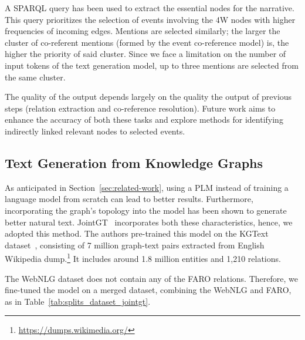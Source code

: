 \documentclass[
hf, %
]{ceurart}
\begin{document}

A SPARQL query has been used to extract the essential nodes for the narrative. This query prioritizes the selection of events involving the 4W nodes with higher frequencies of incoming edges. Mentions are selected similarly; the larger the cluster of co-referent mentions (formed by the event co-reference model) is, the higher the priority of said cluster. Since we face a limitation on the number of input tokens of the text generation model, up to three mentions are selected from the same cluster.

The quality of the output depends largely on the quality the output of previous steps (relation extraction and co-reference resolution). Future work aims to enhance the accuracy of both these tasks and explore methods for identifying indirectly linked relevant nodes to selected events.


\subsection{Text Generation from Knowledge Graphs}
As anticipated in Section~\ref{sec:related-work}, using a PLM instead of training a language model from scratch can lead to better results. Furthermore, incorporating the graph's topology into the model has been shown to generate better natural text. JointGT~\cite{JointGT} incorporates both these characteristics, hence, we adopted this method. The authors pre-trained this model on the KGText dataset~\cite{KGtext}, consisting of 7 million graph-text pairs extracted from English Wikipedia dump.\footnote{\url{https://dumps.wikimedia.org/}} It includes around 1.8 million entities and 1,210 relations.

The WebNLG dataset does not contain any of the FARO relations. Therefore, we fine-tuned the model on a merged dataset, combining the WebNLG and FARO, as in Table~\ref{tab:splits_dataset_jointgt}.
\end{document}
